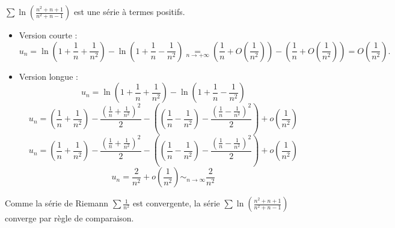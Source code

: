 \documentclass{book}
\begin{document}
\begin{Exercice}[Nature]
\begin{Correction}
\begin{enumerate}
  $\sum \ln\left(\frac{n^2+n+1}{n^2+n-1}\right)$ est une série à termes positifs. 
\begin{itemize}
\item Version courte :
$$u_n=\ln\left(1+\frac{1}{n}+\frac{1}{n^2}\right)-\ln\left(1+\frac{1}{n}-\frac{1}{n^2}\right)\underset{n\rightarrow+\infty}{=}\left(\frac{1}{n}+O\left(\frac{1}{n^2}\right)\right)-\left(\frac{1}{n}+O\left(\frac{1}{n^2}\right)\right)=O\left(\frac{1}{n^2}\right).$$
\item Version longue :
$$u_n=\ln\left(1+\frac{1}{n}+\frac{1}{n^2}\right)-\ln\left(1+\frac{1}{n}-\frac{1}{n^2}\right)$$
$$u_n=\left(\frac{1}{n}+\frac{1}{n^2}\right)-\frac{\left(\frac{1}{n}+\frac{1}{n^2}\right)^2}{2}-\left(\left(\frac{1}{n}-\frac{1}{n^2}\right)-\frac{\left(\frac{1}{n}-\frac{1}{n^2 }\right)^2}{2}\right)+ o\left(\frac{1}{n^2}\right)$$
$$u_n=\left(\frac{1}{n}+\frac{1}{n^2}\right)-\frac{\left(\frac{1}{n}+\frac{1}{n^2}\right)^2}{2}-\left(\left(\frac{1}{n}-\frac{1}{n^2}\right)-\frac{\left(\frac{1}{n}-\frac{1}{n^2 }\right)^2}{2}\right)+ o\left(\frac{1}{n^2}\right)$$
$$ u_n= \frac{2}{n^2} +o\left(\frac{1}{n^2}\right) \sim_{n\to\infty}\frac{2}{n^2}$$
\end{itemize}  
  
Comme la série de Riemann $\sum \frac{1}{n^2}$ est convergente, la série $\sum \ln\left(\frac{n^2+n+1}{n^2+n-1}\right)$ converge par règle de comparaison.
    \end{enumerate}
\end{Correction}
\end{Exercice}
\end{document}

